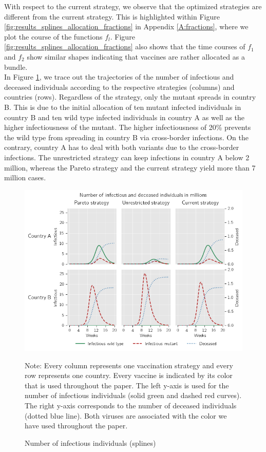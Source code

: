 With respect to the current strategy, we observe that the optimized strategies are different from the current strategy. This is highlighted within Figure \ref{fig:results_splines_allocation_fractions} in Appendix \ref{A:fractions}, where we plot the course of the functions $f_l$. Figure \ref{fig:results_splines_allocation_fractions} also shows that the time courses of $f_1$ and $f_2$ show similar shapes indicating that vaccines are rather allocated as a bundle.\\
 
In Figure \ref{fig:results_splines_infectious_dead}, we trace out the trajectories of the number of infectious and deceased individuals according to the respective strategies (columns) and countries (rows). Regardless of the strategy, only the mutant spreads in country B. This is due to the initial allocation of ten mutant infected individuals in country B and ten wild type infected individuals in country A as well as the higher infectiousness of the mutant. The higher infectiousness of 20\% prevents the wild type from spreading in country B via cross-border infections. On the contrary, country A has to deal with both variants due to the cross-border infections. The unrestricted strategy can keep infections in country A below 2 million, whereas the Pareto strategy and the current strategy yield more than 7 million cases. 


\begin{figure}[h!]
\centering
\includegraphics[scale=0.85]{images/splines_infectious_dead.png}
\begin{flushleft}
\scriptsize{Note:} Every column represents one vaccination strategy and every row represents one country. Every vaccine is indicated by its color that is used throughout the paper. The left y-axis is used for the number of infectious individuals (solid green and dashed red curves). The right y-axis corresponds to the number of deceased individuals (dotted blue line). Both viruses are associated with the color we have used throughout the paper. 
\end{flushleft}
\caption{Number of infectious individuals (splines)}
\label{fig:results_splines_infectious_dead}
\end{figure}



